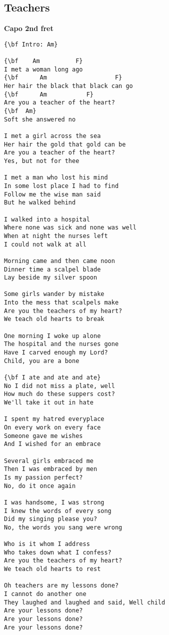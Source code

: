 \documentclass[a4paper]{article}
\begin{document}
\subsection{Teachers} %
\label{sub:Teachers}
{\bf Capo 2nd fret}
\begin{multicols}{2}
\begin{Verbatim}[commandchars=\\\{\}]
{\bf Intro: Am}

{\bf    Am          F}
I met a woman long ago
{\bf      Am                   F}
Her hair the black that black can go
{\bf      Am           F}
Are you a teacher of the heart?
{\bf  Am}
Soft she answered no

I met a girl across the sea
Her hair the gold that gold can be
Are you a teacher of the heart?
Yes, but not for thee

I met a man who lost his mind
In some lost place I had to find
Follow me the wise man said
But he walked behind

I walked into a hospital
Where none was sick and none was well
When at night the nurses left
I could not walk at all

Morning came and then came noon
Dinner time a scalpel blade
Lay beside my silver spoon

Some girls wander by mistake
Into the mess that scalpels make
Are you the teachers of my heart?
We teach old hearts to break

One morning I woke up alone
The hospital and the nurses gone
Have I carved enough my Lord?
Child, you are a bone

{\bf I ate and ate and ate}
No I did not miss a plate, well
How much do these suppers cost?
We'll take it out in hate

I spent my hatred everyplace
On every work on every face
Someone gave me wishes
And I wished for an embrace

Several girls embraced me
Then I was embraced by men
Is my passion perfect?
No, do it once again

I was handsome, I was strong
I knew the words of every song
Did my singing please you?
No, the words you sang were wrong

Who is it whom I address
Who takes down what I confess?
Are you the teachers of my heart?
We teach old hearts to rest

Oh teachers are my lessons done?
I cannot do another one
They laughed and laughed and said, Well child
Are your lessons done?
Are your lessons done?
Are your lessons done?
\end{Verbatim}
\end{multicols}
\newpage
\end{document}
